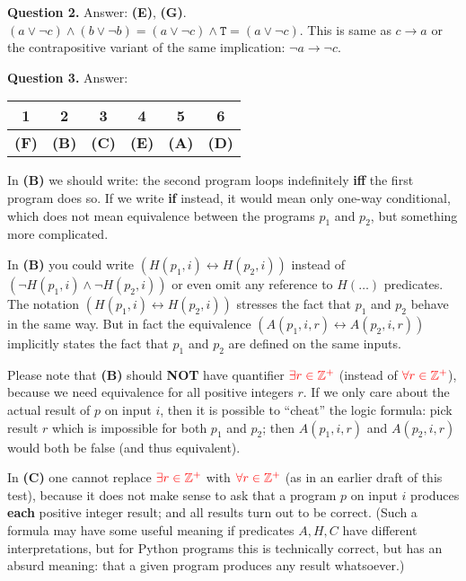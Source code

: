\documentclass[jou]{apa6}
\begin{document}
\vspace{6pt}
{\bf Question 2.} Answer: {\bf (E)}, {\bf (G)}.\\
$(a \vee \neg c) \wedge (b \vee \neg b) = (a \vee \neg c) \wedge \mathtt{T} = (a \vee \neg c)$. 
This is same as $c \rightarrow a$ or the contrapositive variant of the same implication:
$\neg a \rightarrow \neg c$.

\vspace{6pt}
{\bf Question 3.} Answer:\\
\begin{tabular}{|c|c|c|c|c|c|} \hline
1 & 2 & 3 & 4 & 5 & 6 \\ \hline
{\bf (F)} & {\bf (B)} & {\bf (C)} & {\bf (E)} & {\bf (A)} & {\bf (D)} \\ \hline
\end{tabular} 

\vspace{3pt}
In {\bf (B)} we should write: the second program loops indefinitely {\bf iff} 
the first program does so. If we write {\bf if} instead, it 
would mean only one-way conditional, which does not mean 
equivalence between the programs $p_1$ and $p_2$, but something more complicated.

In {\bf (B)} you could write $(H(p_1,i) \leftrightarrow H(p_2,i))$
instead of $(\neg H(p_1,i) \wedge \neg H(p_2,i))$ or 
even omit any reference to $H(\ldots)$ predicates. 
The notation $(H(p_1,i) \leftrightarrow H(p_2,i))$ stresses the fact that $p_1$ and $p_2$ behave in the same way. 
But in fact the equivalence $(A(p_1,i,r) \leftrightarrow A(p_2,i,r))$ implicitly 
states the fact that $p_1$ and $p_2$ are defined on the same inputs.

Please note that {\bf (B)} should {\bf NOT} have quantifier  
 $\textcolor{red}{\exists r \in \mathbb{Z}^{+}}$ 
(instead of  $\textcolor{red}{\forall r \in \mathbb{Z}^{+}}$), because we need
equivalence for all positive integers $r$. If we only care about the
actual result of $p$ on input $i$, then it is possible to ``cheat'' the logic formula: 
pick result $r$ which is impossible for both $p_1$ and $p_2$; then $A(p_1,i,r)$ 
and $A(p_2,i,r)$ would both be false (and thus equivalent).

In {\bf (C)} one cannot replace $\textcolor{red}{\exists r \in \mathbb{Z}^{+}}$
with $\textcolor{red}{\forall r \in \mathbb{Z}^{+}}$ (as in an earlier draft of this test), 
because it does not make sense to ask that a program $p$ on input $i$ produces
{\bf each} positive integer result; and all results turn out to be correct. 
(Such a formula may have some useful meaning if predicates $A,H,C$ have different
interpretations, but for Python programs this is technically correct, but 
has an absurd meaning: that a given program produces any result whatsoever.)
\end{document}
